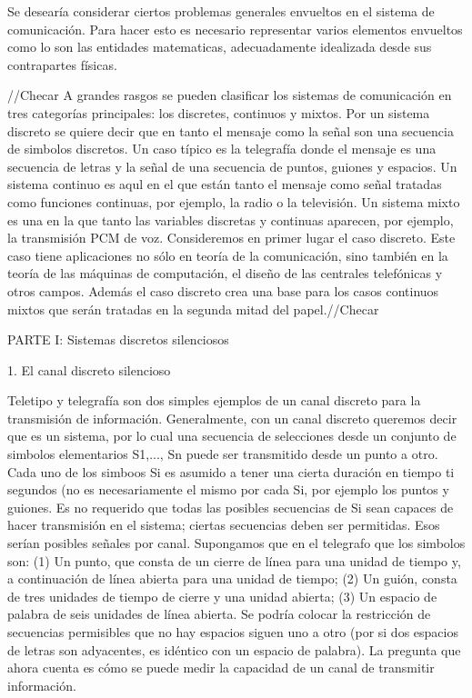  Se desearía considerar ciertos problemas generales envueltos en el
 sistema de comunicación. Para hacer esto es necesario representar
 varios elementos envueltos como lo son las entidades matematicas,
 adecuadamente idealizada desde sus contrapartes físicas.

//Checar
A grandes rasgos se pueden clasificar los sistemas de comunicación en
tres categorías principales: los discretes, continuos y mixtos. Por un
sistema discreto se quiere decir que en tanto el mensaje como la señal
son una secuencia de simbolos discretos. Un caso típico es la
telegrafía donde el mensaje es una secuencia de letras y la señal de
una secuencia de puntos, guiones y espacios. Un sistema continuo es
aqul en el que están tanto el mensaje como señal tratadas como
funciones continuas, por ejemplo, la radio o la televisión. Un sistema
mixto es una en la que tanto las variables discretas y continuas
aparecen, por ejemplo, la transmisión PCM de voz. Consideremos en
primer lugar el caso discreto. Este caso tiene aplicaciones no sólo en
teoría de la comunicación, sino también en la teoría de las máquinas
de computación, el diseño de las centrales telefónicas y otros campos.
Además el caso discreto crea una base para los casos continuos mixtos
que serán tratadas en la segunda mitad del papel.//Checar

PARTE I: Sistemas discretos silenciosos

1. El canal discreto silencioso

Teletipo y telegrafía son dos simples ejemplos de un canal discreto
para la transmisión de información. Generalmente, con un canal
discreto queremos decir que es un sistema, por lo cual una secuencia
de selecciones desde un conjunto de simbolos elementarios S1,..., Sn
puede ser transmitido desde un punto a otro. Cada uno de los simboos
Si es  asumido a tener una cierta duración en tiempo ti segundos (no
es necesariamente el mismo por cada Si, por ejemplo los puntos y
guiones. Es no requerido que todas las posibles secuencias de Si sean
capaces de hacer transmisión en el sistema; ciertas secuencias deben
ser permitidas. Esos serían posibles señales por canal. Supongamos que
en el telegrafo que los simbolos son: (1) Un punto, que consta de un
cierre de línea para una unidad de tiempo y, a continuación de línea
abierta para una unidad de tiempo; (2) Un guión, consta de tres
unidades de tiempo de cierre y una unidad abierta; (3) Un espacio de
palabra de seis unidades de línea abierta. Se podría colocar la
restricción de secuencias permisibles que no hay espacios siguen uno a
otro (por si dos espacios de letras son adyacentes, es idéntico con un
espacio de palabra). La pregunta que ahora cuenta es cómo se puede
medir la capacidad de un canal de transmitir información.

